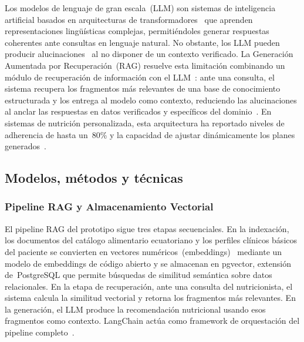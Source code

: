 Los modelos de lenguaje de gran escala~(LLM) son sistemas de inteligencia
artificial basados en arquitecturas de transformadores~\cite{sajun2024} que aprenden
representaciones lingüísticas complejas, permitiéndoles generar respuestas
coherentes ante consultas en lenguaje natural. No obstante, los LLM pueden
producir alucinaciones~\cite{gao2024rag} al no disponer de un contexto verificado. La
Generación Aumentada por Recuperación~(RAG) resuelve esta limitación
combinando un módulo de recuperación de información con el LLM~\cite{lewis2020}: ante una
consulta, el sistema recupera los fragmentos más relevantes de una base de
conocimiento estructurada y los entrega al modelo como contexto,
reduciendo las alucinaciones al anclar las respuestas en datos verificados
y específicos del dominio~\cite{gavai2025,arshad2025}. En sistemas de
nutrición personalizada, esta arquitectura ha reportado niveles de
adherencia de hasta un~80\% y la capacidad de ajustar dinámicamente los
planes generados~\cite{gavai2025}.

\subsection{Modelos, métodos y técnicas}

\subsubsection{Pipeline RAG y Almacenamiento Vectorial}

El pipeline RAG del prototipo sigue tres etapas secuenciales. En la
indexación, los documentos del catálogo alimentario ecuatoriano
y los perfiles clínicos básicos del paciente se convierten en vectores
numéricos~(embeddings)~\cite{patil2023} mediante un modelo de embeddings de código abierto
y se almacenan en pgvector, extensión de~PostgreSQL que permite
búsquedas de similitud semántica sobre datos relacionales. En la etapa de
recuperación, ante una consulta del nutricionista, el sistema
calcula la similitud vectorial y retorna los fragmentos más relevantes.
En la generación, el LLM produce la recomendación nutricional
usando esos fragmentos como contexto. LangChain actúa como framework de
orquestación del pipeline completo~\cite{burgan2024}.

